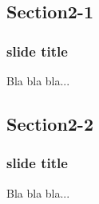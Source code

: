 \documentclass[slidestop,compress,9pt,aspectratio=43]{beamer}
\begin{document}
\subsection{Section2-1}
\begin{frame}
\frametitle{slide title}
Bla bla bla...
\end{frame}

\subsection{Section2-2}
\begin{frame}
\frametitle{slide title}
Bla bla bla...
\end{frame}


\begin{frame}

\begin{center}
\begin{minipage}{0.8\textwidth}
\end{minipage}
\end{center}
\end{frame}





\end{document}
